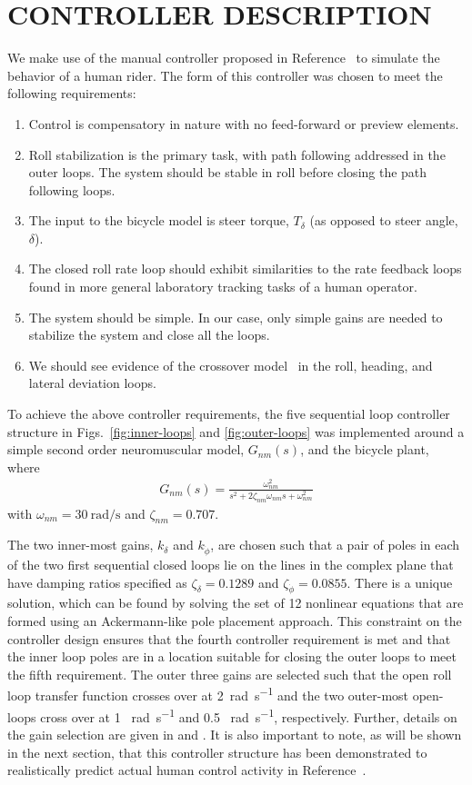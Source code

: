 \documentclass{bmd2016p}
\begin{document}
\section{CONTROLLER DESCRIPTION}
\label{sec:controller-description}
%
We make use of the manual controller proposed in Reference~\cite{Hess2012} to simulate the behavior of a human rider. The form of this controller was chosen to meet the following requirements:
%
\begin{enumerate}
  \item Control is compensatory in nature with no feed-forward or preview elements.
  \item Roll stabilization is the primary task, with path following addressed in the outer loops. The system should be stable in roll before closing the path following loops.
  \item The input to the bicycle model is steer torque, $T_\delta$ (as opposed to steer angle, $\delta$).
  \item The closed roll rate loop should exhibit similarities to the rate feedback loops found in more general laboratory tracking tasks of a human operator.
  \item The system should be simple. In our case, only simple gains are needed to stabilize the system and close all the loops.
  \item We should see evidence of the crossover model~\cite{McRuer1974} in the roll, heading, and lateral deviation loops.
\end{enumerate}

To achieve the above controller requirements, the five sequential loop controller structure in Figs.~\ref{fig:inner-loops} and \ref{fig:outer-loops} was implemented around a simple second order neuromuscular model, $G_{nm}(s)$, and the bicycle plant, where
%
\begin{align}
  G_{nm}(s) = \frac{\omega_{nm}^2}{s^2 + 2\zeta_{nm}\omega_{nm}s + \omega_{nm}^2}
\end{align}
%
with $\omega_{nm}=30~\si{\radian\per\second}$ and $\zeta_{nm}=0.707$.

The two inner-most gains, $k_\delta$ and $k_{\dot{\phi}}$, are chosen such that a pair of poles in each of the two first sequential closed loops lie on the lines in the complex plane that have damping ratios specified as $\zeta_\delta=0.1289$ and $\zeta_{\dot{\phi}}=0.0855$. There is a unique solution, which can be found by solving the set of 12 nonlinear equations that are formed using an Ackermann-like pole placement approach. This constraint on the controller design ensures that the fourth controller requirement is met and that the inner loop poles are in a location suitable for closing the outer loops to meet the fifth requirement. The outer three gains are selected such that the open roll loop transfer function crosses over at 2~\si{\radian\per\second} and the two outer-most open-loops cross over at 1 ~\si{\radian\per\second} and 0.5 ~\si{\radian\per\second}, respectively. Further, details on the gain selection are given in \cite{Hess2012} and \cite{Moore2012}. It is also important to note, as will be shown in the next section, that this controller structure has been demonstrated to realistically predict actual human control activity in Reference~\cite{Moore2012}.
\end{document}
